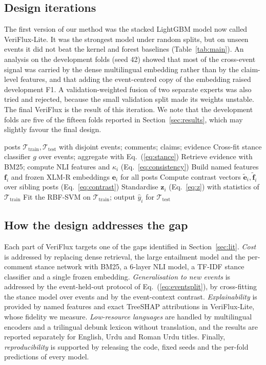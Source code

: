 \documentclass[conference]{IEEEtran}
\begin{document}
\subsection{Design iterations}
The first version of our method was the stacked LightGBM model now called VeriFlux-Lite. It was the strongest
model under random splits, but on unseen events it did not beat the kernel and forest baselines
(Table~\ref{tab:main}). An analysis on the development folds (seed 42) showed that most of the cross-event signal
was carried by the dense multilingual embedding rather than by the claim-level features, and that adding the
event-centred copy of the embedding raised development F1. A validation-weighted fusion of two separate experts
was also tried and rejected, because the small validation split made its weights unstable. The final VeriFlux is
the result of this iteration. We note that the development folds are five of the fifteen folds reported in
Section~\ref{sec:results}, which may slightly favour the final design.

\begin{algorithm}[t]
\caption{VeriFlux training and inference for one fold}
\label{alg:veriflux}
\begin{algorithmic}[1]
\Require posts $\mathcal{T}_{\text{train}},\mathcal{T}_{\text{test}}$ with disjoint events; comments; claims; evidence
\State Cross-fit stance classifier $g$ over events; aggregate with Eq.~(\ref{eq:stance})
\State Retrieve evidence with BM25; compute NLI features and $\kappa_i$ (Eq.~\ref{eq:consistency})
\State Build named features $\mathbf{f}_i$ and frozen XLM-R embeddings $\mathbf{e}_i$ for all posts
\State Compute contrast vectors $\tilde{\mathbf{e}}_i,\tilde{\mathbf{f}}_i$ over sibling posts (Eq.~\ref{eq:contrast})
\State Standardise $\mathbf{z}_i$ (Eq.~\ref{eq:z}) with statistics of $\mathcal{T}_{\text{train}}$
\State Fit the RBF-SVM on $\mathcal{T}_{\text{train}}$; output $\hat{y}_i$ for $\mathcal{T}_{\text{test}}$
\end{algorithmic}
\end{algorithm}

\subsection{How the design addresses the gap}
Each part of VeriFlux targets one of the gaps identified in Section~\ref{sec:lit}. \emph{Cost} is addressed by
replacing dense retrieval, the large entailment model and the per-comment stance network with BM25, a 6-layer
NLI model, a TF-IDF stance classifier and a single frozen embedding. \emph{Generalisation to new events} is
addressed by the event-held-out protocol of Eq.~(\ref{eq:eventsplit}), by cross-fitting the stance model over
events and by the event-context contrast. \emph{Explainability} is provided by named features and exact TreeSHAP
attributions in VeriFlux-Lite, whose fidelity we measure. \emph{Low-resource languages} are handled by
multilingual encoders and a trilingual debunk lexicon without translation, and the results are reported
separately for English, Urdu and Roman Urdu titles. Finally, \emph{reproducibility} is supported by releasing
the code, fixed seeds and the per-fold predictions of every model.
\end{document}
